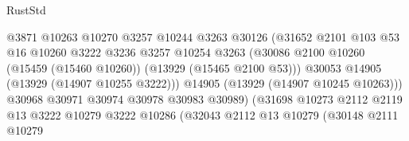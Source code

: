 \begin{lexlean}{RustStd}
\begin{coremodule}
                                            @3871
                                            @10263
                                            @10270
                                            @3257
                                            @10244
                                            @3263
                                            @30126
                                            (@31652
                                              @2101
                                              @103
                                              @53
                                              @16
                                              @10260
                                              @3222
                                              @3236
                                              @3257
                                              @10254
                                              @3263
                                              (@30086
                                                @2100
                                                @10260
                                                (@15459 (@15460 @10260))
                                                (@13929 (@15465 @2100 @53)))
                                              @30053
                                              @14905
                                              (@13929 (@14907 @10255 @3222)))
                                            @14905
                                            (@13929 (@14907 @10245 @10263)))
                                          @30968
                                          @30971
                                          @30974
                                          @30978
                                          @30983
                                          @30989)
                                        (@31698
                                          @10273
                                          @2112
                                          @2119
                                          @13
                                          @3222
                                          @10279
                                          @3222
                                          @10286
                                          (@32043
                                            @2112
                                            @13
                                            @10279
                                            (@30148
                                              @2111
                                              @10279

\end{coremodule}
\end{lexlean}
